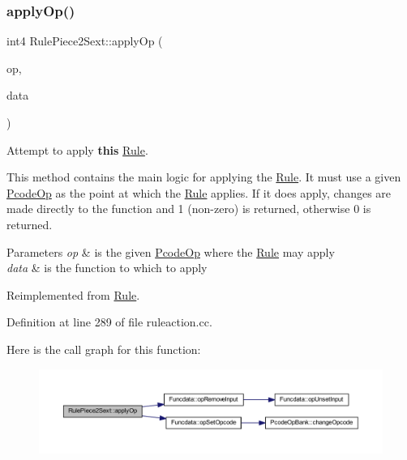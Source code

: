 \subsubsection{\texorpdfstring{applyOp()}{applyOp()}}
{\footnotesize\ttfamily int4 Rule\+Piece2\+Sext\+::apply\+Op (\begin{DoxyParamCaption}\item[{\mbox{\hyperlink{class_pcode_op}{Pcode\+Op}} $\ast$}]{op,  }\item[{\mbox{\hyperlink{class_funcdata}{Funcdata}} \&}]{data }\end{DoxyParamCaption})\hspace{0.3cm}{\ttfamily [virtual]}}



Attempt to apply {\bfseries{this}} \mbox{\hyperlink{class_rule}{Rule}}. 

This method contains the main logic for applying the \mbox{\hyperlink{class_rule}{Rule}}. It must use a given \mbox{\hyperlink{class_pcode_op}{Pcode\+Op}} as the point at which the \mbox{\hyperlink{class_rule}{Rule}} applies. If it does apply, changes are made directly to the function and 1 (non-\/zero) is returned, otherwise 0 is returned. 
\begin{DoxyParams}{Parameters}
{\em op} & is the given \mbox{\hyperlink{class_pcode_op}{Pcode\+Op}} where the \mbox{\hyperlink{class_rule}{Rule}} may apply \\
\hline
{\em data} & is the function to which to apply \\
\hline
\end{DoxyParams}


Reimplemented from \mbox{\hyperlink{class_rule_a4e3e61f066670175009f60fb9dc60848}{Rule}}.



Definition at line 289 of file ruleaction.\+cc.

Here is the call graph for this function\+:
\nopagebreak
\begin{figure}[H]
\begin{center}
\leavevmode
\includegraphics[width=350pt]{class_rule_piece2_sext_a37acf429e9c05f9f03977b136b3bfc22_cgraph}
\end{center}
\end{figure}
\mbox{\label{class_rule_piece2_sext_afe4ede287edfde1d4036142f24469728}} 
